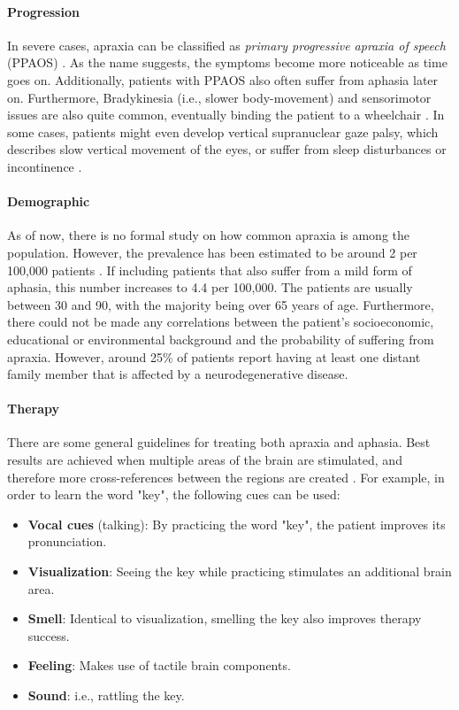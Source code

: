 \documentclass[draft,final]{vutinfth} %
\begin{document}
\paragraph{Progression} In severe cases, apraxia can be classified as \emph{primary progressive apraxia of speech } (PPAOS) \cite{utianski2023update}. As the name suggests, the symptoms become more noticeable as time goes on. Additionally, patients with PPAOS also often suffer from aphasia later on. Furthermore, Bradykinesia (i.e., slower body-movement) and sensorimotor issues are also quite common, eventually binding the patient to a wheelchair \cite{utianski2023update}. In some cases, patients might even develop vertical supranuclear gaze palsy, which describes slow vertical movement of the eyes, or suffer from sleep disturbances or incontinence \cite{utianski2023update}.

\paragraph{Demographic} As of now, there is no formal study on how common apraxia is among the population. However, the prevalence has been estimated to be around 2 per 100,000 patients \cite{duffy2021primary}. If including patients that also suffer from a mild form of aphasia, this number increases to 4.4 per 100,000. The patients are usually between 30 and 90, with the majority being over 65 years of age. Furthermore, there could not be made any correlations between the patient's socioeconomic, educational or environmental background and the probability of suffering from apraxia. However, around 25\% of patients report having at least one distant family member that is affected by a neurodegenerative disease.

\paragraph{Therapy} There are some general guidelines for treating both apraxia and aphasia. Best results are achieved when multiple areas of the brain are stimulated, and therefore more cross-references between the regions are created \cite{proestler2023}. For example, in order to learn the word "key", the following cues can be used:
\begin{itemize}
\item \textbf{Vocal cues} (talking): By practicing the word "key", the patient improves its pronunciation.
\item \textbf{Visualization}: Seeing the key while practicing stimulates an additional brain area.
\item \textbf{Smell}: Identical to visualization, smelling the key also improves therapy success.
\item \textbf{Feeling}: Makes use of tactile brain components.
\item \textbf{Sound}: i.e., rattling the key.
\end{itemize}
\end{document}
